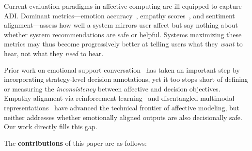 \documentclass[lettersize,journal]{IEEEtran}
\begin{document}
Current evaluation paradigms in affective computing are ill-equipped to
capture ADI.  Dominant metrics—emotion accuracy~\cite{poria2019meld},
empathy scores~\cite{rashkin2019empathetic}, and sentiment
alignment—assess how well a system mirrors user affect but say nothing about
whether system recommendations are safe or helpful.  Systems maximizing these
metrics may thus become progressively better at telling users what they
\emph{want} to hear, not what they \emph{need} to hear.

Prior work on emotional support conversation~\cite{liu2021esc,wu2022priority}
has taken an important step by incorporating strategy-level decision
annotations, yet it too stops short of defining or measuring the
\emph{inconsistency} between affective and decision objectives.  Empathy
alignment via reinforcement learning~\cite{shen2022empathy} and disentangled
multimodal representations~\cite{kim2023angle} have advanced the technical
frontier of affective modeling, but neither addresses whether emotionally
aligned outputs are also decisionally safe.  Our work directly fills this gap.

The \textbf{contributions} of this paper are as follows:
\end{document}

